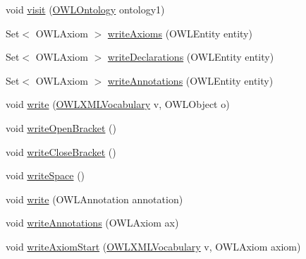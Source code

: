 \begin{DoxyCompactItemize}
\item 
void \hyperlink{classorg_1_1coode_1_1owlapi_1_1functionalrenderer_1_1_o_w_l_object_renderer_a0a1954459eab0ba6b9055e721096c152}{visit} (\hyperlink{interfaceorg_1_1semanticweb_1_1owlapi_1_1model_1_1_o_w_l_ontology}{O\-W\-L\-Ontology} ontology1)
\item 
Set$<$ O\-W\-L\-Axiom $>$ \hyperlink{classorg_1_1coode_1_1owlapi_1_1functionalrenderer_1_1_o_w_l_object_renderer_ae604bc5d14ae78f6a9219dd834601f0d}{write\-Axioms} (O\-W\-L\-Entity entity)
\item 
Set$<$ O\-W\-L\-Axiom $>$ \hyperlink{classorg_1_1coode_1_1owlapi_1_1functionalrenderer_1_1_o_w_l_object_renderer_a0ec8c29689472b7cbdd9963d9fd8ace4}{write\-Declarations} (O\-W\-L\-Entity entity)
\item 
Set$<$ O\-W\-L\-Axiom $>$ \hyperlink{classorg_1_1coode_1_1owlapi_1_1functionalrenderer_1_1_o_w_l_object_renderer_a2e523eae24fa6b77bab181f3d46819d1}{write\-Annotations} (O\-W\-L\-Entity entity)
\item 
void \hyperlink{classorg_1_1coode_1_1owlapi_1_1functionalrenderer_1_1_o_w_l_object_renderer_a97d32d62769577f177a78e1fc22d2156}{write} (\hyperlink{enumorg_1_1semanticweb_1_1owlapi_1_1vocab_1_1_o_w_l_x_m_l_vocabulary}{O\-W\-L\-X\-M\-L\-Vocabulary} v, O\-W\-L\-Object o)
\item 
void \hyperlink{classorg_1_1coode_1_1owlapi_1_1functionalrenderer_1_1_o_w_l_object_renderer_ae66c2899a8c2220b4cac597920f9b5cf}{write\-Open\-Bracket} ()
\item 
void \hyperlink{classorg_1_1coode_1_1owlapi_1_1functionalrenderer_1_1_o_w_l_object_renderer_accb244e59039645b9f7608396e2c753f}{write\-Close\-Bracket} ()
\item 
void \hyperlink{classorg_1_1coode_1_1owlapi_1_1functionalrenderer_1_1_o_w_l_object_renderer_a0c7a4a185e7c8962fbb03c746244655d}{write\-Space} ()
\item 
void \hyperlink{classorg_1_1coode_1_1owlapi_1_1functionalrenderer_1_1_o_w_l_object_renderer_a7b76b6099d8d0932ae35f73a3b091648}{write} (O\-W\-L\-Annotation annotation)
\item 
void \hyperlink{classorg_1_1coode_1_1owlapi_1_1functionalrenderer_1_1_o_w_l_object_renderer_a4b802e8a1abce736d7712500b3035b93}{write\-Annotations} (O\-W\-L\-Axiom ax)
\item 
void \hyperlink{classorg_1_1coode_1_1owlapi_1_1functionalrenderer_1_1_o_w_l_object_renderer_a314314ed0bed6fcdbee840fc8b81fdf0}{write\-Axiom\-Start} (\hyperlink{enumorg_1_1semanticweb_1_1owlapi_1_1vocab_1_1_o_w_l_x_m_l_vocabulary}{O\-W\-L\-X\-M\-L\-Vocabulary} v, O\-W\-L\-Axiom axiom)

\end{DoxyCompactItemize}
